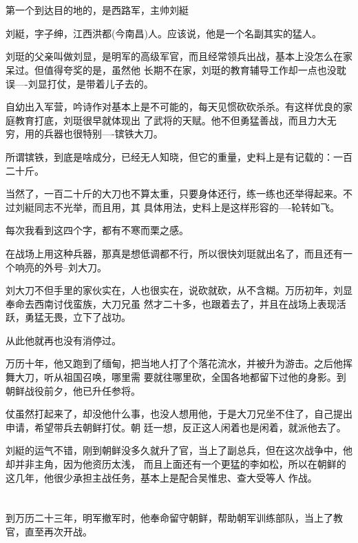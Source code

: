\documentclass[11pt,a4paper,onecolumn]{article}
\begin{document}
\section[\thesection]{}

第一个到达目的地的，是西路军，主帅刘綎

刘綎，字子绅，江西洪都(今南昌)人。应该说，他是一个名副其实的猛人。

刘珽的父亲叫做刘显，是明军的高级军官，而且经常领兵出战，基本上没怎么在家呆过。但值得夸奖的是，虽然他
长期不在家，刘珽的教育辅导工作却一点也没耽误----刘显打仗，是带着儿子去的。

自幼出入军营，吟诗作对基本上是不可能的，每天见惯砍砍杀杀。有这样优良的家庭教育打底，刘珽很早就体现出
了武将的天赋。他不但勇猛善战，而且力大无穷，用的兵器也很特别----镔铁大刀。

所谓镔铁，到底是啥成分，已经无人知晓，但它的重量，史料上是有记载的：一百二十斤。

当然了，一百二十斤的大刀也不算太重，只要身体还行，练一练也还举得起来。不过刘綎同志不光举，而且用，其
具体用法，史料上是这样形容的----轮转如飞。

每次我看到这四个字，都有不寒而栗之感。

在战场上用这种兵器，那真是想低调都不行，所以很快刘珽就出名了，而且还有一个响亮的外号--刘大刀。

刘大刀不但手里的家伙实在，人也很实在，说砍就砍，从不含糊。万历初年，刘显奉命去西南讨伐蛮族，大刀兄虽
然才二十多，也跟着去了，并且在战场上表现活跃，勇猛无畏，立下了战功。

从此他就再也没有消停过。

万历十年，他又跑到了缅甸，把当地人打了个落花流水，并被升为游击。之后他挥舞大刀，听从祖国召唤，哪里需
要就往哪里砍，全国各地都留下过他的身影。到朝鲜战役前夕，他已升任参将。

仗虽然打起来了，却没他什么事，也没人想用他，于是大刀兄坐不住了，自己提出申请，希望带兵去朝鲜打仗。朝
廷一想，反正这人闲着也是闲着，就派他去了。

刘綎的运气不错，刚到朝鲜没多久就升了官，当上了副总兵，但在这次战争中，他却并非主角，因为他资历太浅，
而且上面还有一个更猛的李如松，所以在朝鲜的这几年，他很少承担主战任务，基本上是配合吴惟忠、查大受等人
作战。

\section[\thesection]{}

到万历二十三年，明军撤军时，他奉命留守朝鲜，帮助朝军训练部队，当上了教官，直至再次开战。
\end{document}
